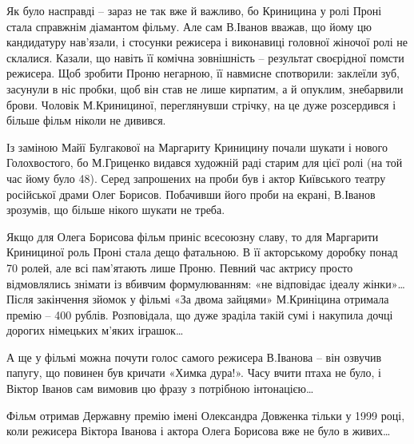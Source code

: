 Як було насправді – зараз не так вже й важливо, бо Криницина у ролі Проні стала
справжнім діамантом фільму. Але сам В.Іванов вважав, що йому цю кандидатуру
нав'язали, і стосунки режисера і виконавиці головної жіночої ролі не склалися.
Казали, що навіть її комічна зовнішність – результат своєрідної помсти
режисера. Щоб зробити Проню негарною, її навмисне спотворили: заклеїли зуб,
засунули в ніс пробки, щоб він став не лише кирпатим, а й опуклим, знебарвили
брови. Чоловік М.Кринициної, переглянувши стрічку, на це дуже розсердився і
більше фільм ніколи не дивився.

Із заміною Майї Булгакової на Маргариту Криницину почали шукати і нового
Голохвостого, бо М.Гриценко видався художній раді старим для цієї ролі (на той
час йому було 48). Серед запрошених на проби був і актор Київського театру
російської драми Олег Борисов. Побачивши його проби на екрані, В.Іванов
зрозумів, що більше нікого шукати не треба. 

Якщо для Олега Борисова фільм приніс всесоюзну славу, то для Маргарити
Кринициної роль Проні стала дещо фатальною. В її акторському доробку понад 70
ролей, але всі пам'ятають лише Проню. Певний час актрису просто відмовлялись
знімати із вбивчим формулюванням: «не відповідає ідеалу жінки»… Після
закінчення зйомок у фільмі «За двома зайцями» М.Криніцина отримала премію – 400
рублів. Розповідала, що дуже зраділа такій сумі і накупила дочці дорогих
німецьких м'яких іграшок…

А ще у фільмі можна почути голос самого режисера В.Іванова – він озвучив
папугу, що повинен був кричати «Химка дура!». Часу вчити птаха не було, і
Віктор Іванов сам вимовив цю фразу з потрібною інтонацією…

Фільм отримав Державну премію імені Олександра Довженка тільки у 1999 році,
коли режисера Віктора Іванова і актора Олега Борисова вже не було в живих…
